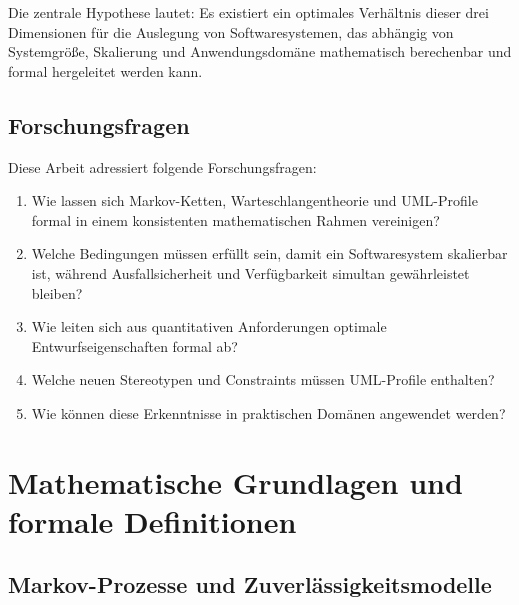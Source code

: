 \documentclass[a4paper,11pt]{article}
\theoremstyle{definition}
\begin{document}
Die zentrale Hypothese lautet: Es existiert ein optimales Verhältnis dieser drei Dimensionen 
für die Auslegung von Softwaresystemen, das abhängig von Systemgröße, Skalierung und 
Anwendungsdomäne mathematisch berechenbar und formal hergeleitet werden kann.

\subsection{Forschungsfragen}

Diese Arbeit adressiert folgende Forschungsfragen:

\begin{enumerate}
    \item Wie lassen sich Markov-Ketten, Warteschlangentheorie und UML-Profile formal 
          in einem konsistenten mathematischen Rahmen vereinigen?
    \item Welche Bedingungen müssen erfüllt sein, damit ein Softwaresystem skalierbar 
          ist, während Ausfallsicherheit und Verfügbarkeit simultan gewährleistet bleiben?
    \item Wie leiten sich aus quantitativen Anforderungen optimale Entwurfseigenschaften 
          formal ab?
    \item Welche neuen Stereotypen und Constraints müssen UML-Profile enthalten?
    \item Wie können diese Erkenntnisse in praktischen Domänen angewendet werden?
\end{enumerate}

\section{Mathematische Grundlagen und formale Definitionen}

\subsection{Markov-Prozesse und Zuverlässigkeitsmodelle}
\end{document}
